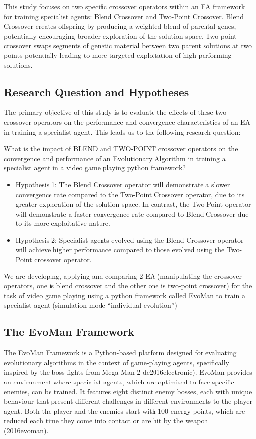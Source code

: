 This study focuses on two specific crossover operators within an EA framework for training specialist agents: Blend Crossover and Two-Point Crossover.
Blend Crossover creates offspring by producing a weighted blend of parental genes, potentially encouraging broader exploration of the solution space.
Two-point crossover swaps segments of genetic material between two parent solutions at two points potentially leading to more targeted exploitation of high-performing solutions.

\subsection{Research Question and Hypotheses}
The primary objective of this study is to evaluate the effects of these two crossover operators on the performance and convergence characteristics of an EA in training a specialist agent.
This leads us to the following research question:

What is the impact of BLEND and TWO-POINT crossover operators on the convergence and performance of an Evolutionary Algorithm in training a specialist agent in a video game playing python framework?

\begin{itemize}
\item Hypothesis 1: The Blend Crossover operator will demonstrate a slower convergence rate compared to the Two-Point Crossover operator, due to its greater exploration of the solution space. In contrast, the Two-Point operator will demonstrate a faster convergence rate compared to Blend Crossover due to its more exploitative nature.
\item Hypothesis 2: Specialist agents evolved using the Blend Crossover operator will achieve higher performance compared to those evolved using the Two-Point crossover operator.
\end{itemize}

We are developing, applying and comparing 2 EA (manipulating the crossover operators, one is blend crossover and the other one is two-point crossover) for the task of video game playing using a python framework called EvoMan to train a specialist agent (simulation mode “individual evolution”)


\subsection{The EvoMan Framework}
The EvoMan Framework is a Python-based platform designed for evaluating evolutionary algorithms in the context of game-playing agents, specifically inspired by the boss fights from Mega Man 2 de2016electronic).
EvoMan provides an environment where specialist agents, which are optimised to face specific enemies, can be trained.
It features eight distinct enemy bosses, each with unique behaviour that present different challenges in different environments to the player agent.
Both the player and the enemies start with 100 energy points, which are reduced each time they come into contact or are hit by the weapon (2016evoman).



